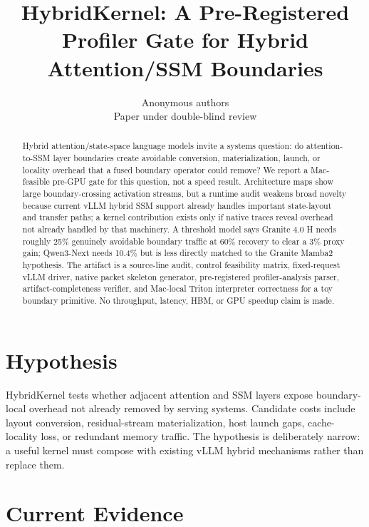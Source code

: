 \documentclass{article}
\title{HybridKernel: A Pre-Registered Profiler Gate for Hybrid Attention/SSM Boundaries}
\author{Anonymous authors\\Paper under double-blind review}
\begin{document}
\maketitle

\begin{abstract}
Hybrid attention/state-space language models invite a systems question: do attention-to-SSM layer boundaries create avoidable conversion, materialization, launch, or locality overhead that a fused boundary operator could remove? We report a Mac-feasible pre-GPU gate for this question, not a speed result. Architecture maps show large boundary-crossing activation streams, but a runtime audit weakens broad novelty because current vLLM hybrid SSM support already handles important state-layout and transfer paths; a kernel contribution exists only if native traces reveal overhead not already handled by that machinery. A threshold model says Granite 4.0 H needs roughly 25\% genuinely avoidable boundary traffic at 60\% recovery to clear a 3\% proxy gain; Qwen3-Next needs 10.4\% but is less directly matched to the Granite Mamba2 hypothesis. The artifact is a source-line audit, control feasibility matrix, fixed-request vLLM driver, native packet skeleton generator, pre-registered profiler-analysis parser, artifact-completeness verifier, and Mac-local Triton interpreter correctness for a toy boundary primitive. No throughput, latency, HBM, or GPU speedup claim is made.
\end{abstract}

\section{Hypothesis}

HybridKernel tests whether adjacent attention and SSM layers expose boundary-local overhead not already removed by serving systems. Candidate costs include layout conversion, residual-stream materialization, host launch gaps, cache-locality loss, or redundant memory traffic. The hypothesis is deliberately narrow: a useful kernel must compose with existing vLLM hybrid mechanisms rather than replace them.

\section{Current Evidence}
\end{document}
